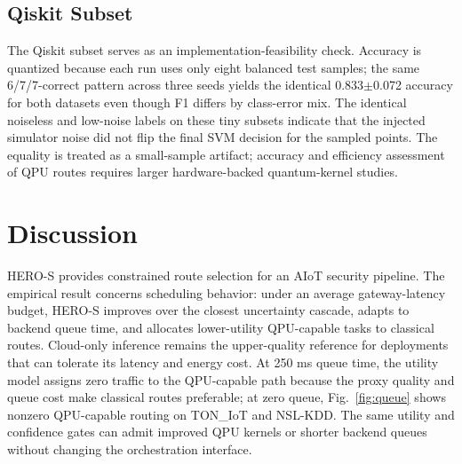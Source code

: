\documentclass[conference]{IEEEtran}
\begin{document}
\subsection{Qiskit Subset}
\begin{table}[t]
\caption{Qiskit quantum-kernel subset validation.}
\label{tab:qiskit}
\centering
\scriptsize
{}
\end{table}

The Qiskit subset serves as an implementation-feasibility check. Accuracy is quantized because each run uses only eight balanced test samples; the same 6/7/7-correct pattern across three seeds yields the identical 0.833$\pm$0.072 accuracy for both datasets even though F1 differs by class-error mix. The identical noiseless and low-noise labels on these tiny subsets indicate that the injected simulator noise did not flip the final SVM decision for the sampled points. The equality is treated as a small-sample artifact; accuracy and efficiency assessment of QPU routes requires larger hardware-backed quantum-kernel studies.

\section{Discussion}
HERO-S provides constrained route selection for an AIoT security pipeline. The empirical result concerns scheduling behavior: under an average gateway-latency budget, HERO-S improves over the closest uncertainty cascade, adapts to backend queue time, and allocates lower-utility QPU-capable tasks to classical routes. Cloud-only inference remains the upper-quality reference for deployments that can tolerate its latency and energy cost. At 250 ms queue time, the utility model assigns zero traffic to the QPU-capable path because the proxy quality and queue cost make classical routes preferable; at zero queue, Fig.~\ref{fig:queue} shows nonzero QPU-capable routing on TON\_IoT and NSL-KDD. The same utility and confidence gates can admit improved QPU kernels or shorter backend queues without changing the orchestration interface.
\end{document}
